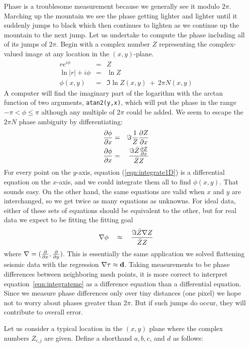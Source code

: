 \par
Phase is a troublesome measurement because
we generally see it modulo $2\pi$.
Marching up the mountain we see the phase getting lighter and lighter
until it suddenly jumps to black which then continues to lighten
as we continue up the mountain to the next jump.
Let us undertake to compute the phase including
all of its jumps of $2\pi$.
Begin with a complex number $Z$ representing
the complex-valued image at any location
in the $(x,y)$-plane.
\begin{eqnarray}
r e^{i \phi}   &=& Z \\
\ln |r| + i \phi &=& \ln Z \\
\phi(x,y)            &=&  \Im \ln Z(x,y) ~+~  2\pi N(x,y)
\end{eqnarray}
A computer will find the imaginary part of the logarithm
with the arctan function of two arguments, {\tt atan2(y,x)},
which will put the phase in the range $-\pi < \phi \le \pi$
although any multiple of $2\pi$ could be added.
We seem to escape the $2\pi N$ phase ambiguity by differentiating:
\begin{eqnarray}
{\partial\phi \over \partial x}&=& \Im {1 \over Z}{\partial Z \over \partial x}\\
{\partial\phi \over \partial x}&=&
        {\Im  \bar Z {\partial Z \over \partial x} \over \bar Z Z }
\label{eqn:integrate1D}
\end{eqnarray}
For every point on the $y$-axis, equation (\ref{eqn:integrate1D})
is a differential equation on the $x$-axis,
and we could integrate them all to find $\phi(x,y)$.
That sounds easy.
On the other hand,
the same equations are valid when $x$ and $y$ are interchanged,
so we get twice as many equations as unknowns.
For ideal data, either of these sets of equations
should be equivalent to the other,
but for real data we expect to be fitting the fitting goal
\begin{equation}
\nabla \phi \quad \approx \quad {\Im  \bar Z \nabla Z \over \bar Z Z}
\label{eqn:integrateme}
\end{equation}
where
$\nabla = ({\partial \over \partial x}, {\partial \over \partial y} ) $.
This is essentially the same application we solved flattening seismic data with the regression 
$\nabla \tau \approx {\bf d}$. Taking measurements to be phase differences 
between neighboring mesh points, it is more correct to interpret equation~\ref{eqn:integrateme} as 
a difference equation than a differential equation. Since we measure phase differences only over tiny distances (one pixel) we hope not to worry about phases greater than $2\pi$.
But if such jumps do occur, they will contribute to overall error.
\par
Let us consider a typical location in the $(x , y )$ plane where the complex numbers
$Z_{i,j}$ are given. Define a shorthand $a , b, c$, and $d$ as follows: 

